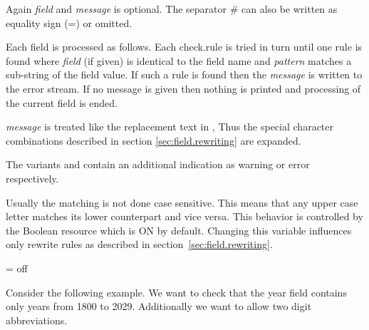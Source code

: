 \documentclass[11pt,a4paper]{scrbook}
\begin{document}
\begin{Resources}
\end{Resources}

Again \emph{field} and \emph{message} is optional. The separator \# can also
be written as equality sign (=) or omitted.

Each field is processed as follows. Each check.rule is tried in turn until one
rule is found where \emph{field} (if given) is identical to the field name and
\emph{pattern} matches a sub-string of the field value. If such a rule is
found then the \emph{message} is written to the error stream. If no message is
given then nothing is printed and processing of the current field is ended.

\emph{message} is treated like the replacement text in ,
Thus the special character combinations described in section
\ref{sec:field.rewriting} are expanded.

The variants  and  contain an
additional indication as warning or error respectively.

Usually the matching is not done case sensitive. This means that any upper
case letter matches its lower counterpart and vice versa. This behavior is
controlled by the Boolean resource  which is ON by
default. Changing this variable influences only rewrite rules as described in
section~\ref{sec:field.rewriting}.

\begin{Resources}
   = off
\end{Resources}

Consider the following example. We want to check that the year field contains
only years from 1800 to 2029. Additionally we want to allow two digit
abbreviations.

\begin{Resources}
\end{Resources}
\end{document}
